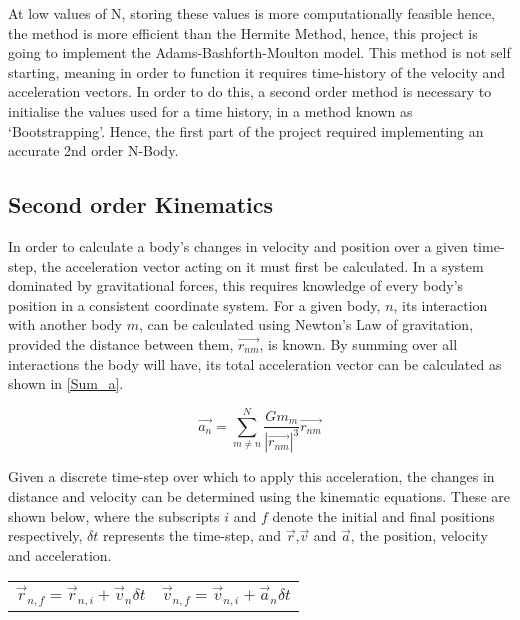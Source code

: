 \documentclass[a4paper,10pt]{article}
\begin{document}
At low values of N, storing these values is more computationally feasible hence, the method is more efficient than the Hermite Method, hence, this project is going to implement the Adams-Bashforth-Moulton model. This method is not self starting, meaning in order to function it requires time-history of the velocity and acceleration vectors. In order to do this, a second order method is necessary to initialise the values used for a time history, in a method known as `Bootstrapping'. Hence, the first part of the project required implementing an accurate 2nd order N-Body. 

\subsection{Second order Kinematics}

In order to calculate a body's changes in velocity and position over a given time-step, the acceleration vector acting on it must first be calculated. In a system dominated by gravitational forces, this requires knowledge of every body's position in a consistent coordinate system. For a given body, $n$, its interaction with another body $m$, can be calculated using Newton's Law of gravitation, provided the distance between them, $\vec{r_{nm}}$, is known. By summing over all interactions the body will have, its total acceleration vector can be calculated as shown in \cref{Sum_a}.

\begin{equation} \label{Sum_a}
    \vec{a_n} =  \sum\limits_{m\neq n}^{N} \frac{G m_m}{\left|\vec{r_{nm}}\right|^3}\vec{r_{nm}}
\end{equation}

Given a discrete time-step over which to apply this acceleration, the changes in distance and velocity can be determined using the kinematic equations. These are shown below, where the subscripts $i$ and $f$ denote the initial and final positions respectively, $\delta t$ represents the time-step, and $\vec r$,$\vec v$ and $\vec a$, the position, velocity and acceleration. %

\noindent\begin{tabularx}{\textwidth}{@{}XX@{}}
  \begin{equation*}
   \vec{r}_{n,f} =  \vec{r}_{n,i} + \vec{v}_{n} \delta t
    \label{PositionFD}
  \end{equation*} &
  \begin{equation*}
 \vec{v}_{n,f} =  \vec{v}_{n,i} + \vec{a}_{n} \delta t
    \label{VelocityFD}
  \end{equation*}
\end{tabularx}
\end{document}
